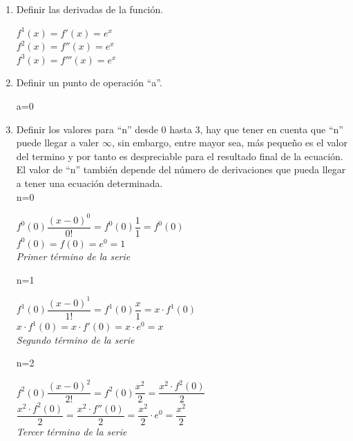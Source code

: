 \documentclass[a4paper,12pt,twoside]{proyectotanquesecci}
\begin{document}
\begin{enumerate}

\item Definir las derivadas de la función.
	\begin{center}
		$f^{1}\left( x\right) =f'\left( x\right) =e^{x}$\\
		$f^{2}\left( x\right) =f''\left( x\right) =e^{x}$\\
		$f^{3}\left( x\right) =f'''\left( x\right) =e^{x}$
	\end{center}
\item Definir un punto de operación “a”.
	\begin{center} a=0 \end{center}
\item Definir los valores para “n” desde 0 hasta 3, hay que tener en cuenta que “n” puede llegar a valer $\infty$, sin embargo, entre mayor sea, más pequeño es el valor del termino y por tanto es despreciable para el resultado final de la ecuación. El valor de “n” también depende del número de derivaciones que pueda llegar a tener una ecuación determinada.\\

	n=0
	\begin{center}
		$f^{0}\left( 0\right) \dfrac {\left( x-0\right) ^{0}}{0!}=f^{0}\left( 0\right) \dfrac {1}{1}=f^{0}\left( 0\right)$\\
		$f^{0}\left( 0\right) =f\left( 0\right) =e^{0}=1$ \\
		\textit{ Primer término de la serie }\\
	\end{center}
	
	n=1
	\begin{center}
		$f^{1}\left( 0\right) \dfrac {\left( x-0\right) ^{1}}{1!}=f^{1}\left( 0\right) \dfrac {x}{1}=x\cdot f^{1}\left( 0\right)$\\
		$x\cdot f^{1}\left( 0\right) =x\cdot f'\left( 0\right) =x\cdot e^{0}=x$\\
		\textit{ Segundo término de la serie }\\
	\end{center}
	
	n=2
	\begin{center}
		$f^{2}\left( 0\right) \dfrac {\left( x-0\right) ^{2}}{2!}=f^{2}\left( 0\right) \dfrac {x^{2}}{2}=\dfrac {x^{2}\cdot f^{2}\left( 0\right) }{2}$\\
		$\dfrac {x^{2}\cdot f^{2}\left( 0\right) }{2}=\dfrac {x^{2}\cdot f''\left( 0\right) }{2}=\dfrac {x^{2}}{2}\cdot e^{0}=\dfrac {x^{2}}{2}$\\
		\textit{ Tercer término de la serie }\\
	\end{center}
	

\end{enumerate}
\end{document}

